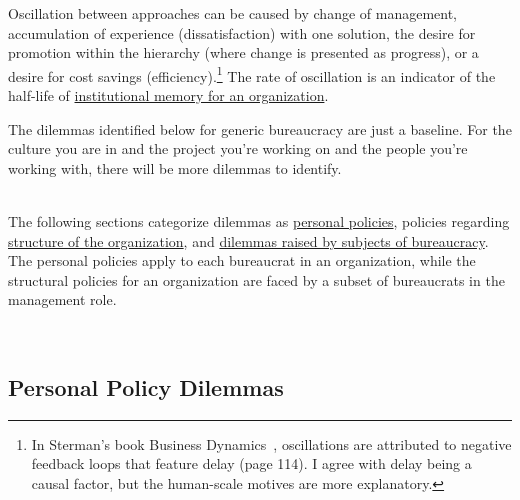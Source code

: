 Oscillation between approaches can be caused by change of management, accumulation of experience (dissatisfaction) with one solution, the desire for promotion within the hierarchy (where change is presented as progress), or a desire for cost savings (efficiency).\footnote{In Sterman's book Business Dynamics~\cite{2000_Sterman}, oscillations are attributed to negative feedback loops that feature delay (page 114). I agree with delay being a causal factor, but the human-scale motives
are more explanatory.} The rate of oscillation is an indicator of the half-life of \href{https://en.wikipedia.org/wiki/Institutional_memory}{institutional memory for an organization}. 

The dilemmas identified below for generic bureaucracy are just a baseline. For the culture you are in and the project you're working on and the people you're working with, there will be more dilemmas to identify. 

\ \\

The following sections categorize dilemmas as \hyperref[sec:personal-policy-dilemmas]{personal policies}, 
{} 
policies regarding \hyperref[sec:org-dilemma]{structure of the organization},
{} 
and \hyperref[sec:subjects-dilemmas]{dilemmas raised by subjects of bureaucracy}. 
The personal policies apply to each bureaucrat in an organization, while the structural policies for an organization are faced by a subset of bureaucrats in the management role. 



\ \\


\subsection*{Personal Policy Dilemmas \label{sec:personal-policy-dilemmas}}

